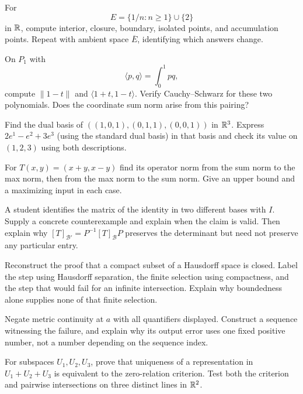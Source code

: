 \begin{exercise}
For
\[
E=\{1/n:n\geq1\}\cup\{2\}
\]
 in $\mathbb{R}$, compute interior, closure,
boundary, isolated points, and accumulation points. Repeat with ambient
space $\overline E$, identifying which answers change.
\end{exercise}
\begin{exercise}
On $P_1$ with
\[
\langle p,q\rangle=\int_0^1pq,
\]
 compute
$\|1-t\|$ and $\langle1+t,1-t\rangle$. Verify Cauchy--Schwarz for
these two polynomials. Does the coordinate sum norm arise from this pairing?
\end{exercise}
\begin{exercise}
Find the dual basis of $((1,0,1),(0,1,1),(0,0,1))$ in $\mathbb{R}^3$.
Express $2e^1-e^2+3e^3$ (using the standard dual basis) in that basis and check its value on
$(1,2,3)$ using both descriptions.
\end{exercise}
\begin{exercise}
For $T(x,y)=(x+y,x-y)$ find its operator norm from the sum norm to
the max norm, then from the max norm to the sum norm. Give an upper
bound and a maximizing input in each case.
\end{exercise}
\begin{exercise}
A student identifies the matrix of the identity in two different bases
with $I$. Supply a concrete counterexample and explain when the claim is
valid. Then explain why $[T]_{\mathcal B'}=P^{-1}[T]_{\mathcal B}P$
preserves the determinant but need not preserve any particular entry.
\end{exercise}

\begin{exercise}
Reconstruct the proof that a compact subset of a Hausdorff space is closed.
Label the step using Hausdorff separation, the finite selection using
compactness, and the step that would fail for an infinite intersection.
Explain why boundedness alone supplies none of that finite selection.
\end{exercise}
\begin{exercise}
Negate metric continuity at $a$ with all quantifiers displayed. Construct a
sequence witnessing the failure, and explain why its output error uses one
fixed positive number, not a number depending on the sequence index.
\end{exercise}
\begin{exercise}
For subspaces $U_1,U_2,U_3$, prove that uniqueness of a representation in
$U_1+U_2+U_3$ is equivalent to the zero-relation criterion. Test both the
criterion and pairwise intersections on three distinct lines in $\mathbb{R}^2$.
\end{exercise}

